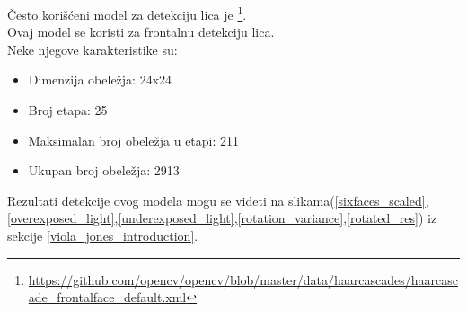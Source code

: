 Često korišćeni model za detekciju lica je
\texttt{}\footnote{\url{https://github.com/opencv/opencv/blob/master/data/haarcascades/haarcascade_frontalface_default.xml}}. \\
Ovaj model se koristi za frontalnu detekciju lica. \\
Neke njegove karakteristike su:
\begin{itemize}
\item Dimenzija obeležja: 24x24
\item Broj etapa: 25
\item Maksimalan broj obeležja u etapi: 211
\item Ukupan broj obeležja: 2913
\end{itemize}

\noindent
Rezultati detekcije ovog modela mogu se videti na
slikama(\ref{sixfaces_scaled},\ref{overexposed_light},\ref{underexposed_light},\ref{rotation_variance},\ref{rotated_res})
iz sekcije \ref{viola_jones_introduction}.